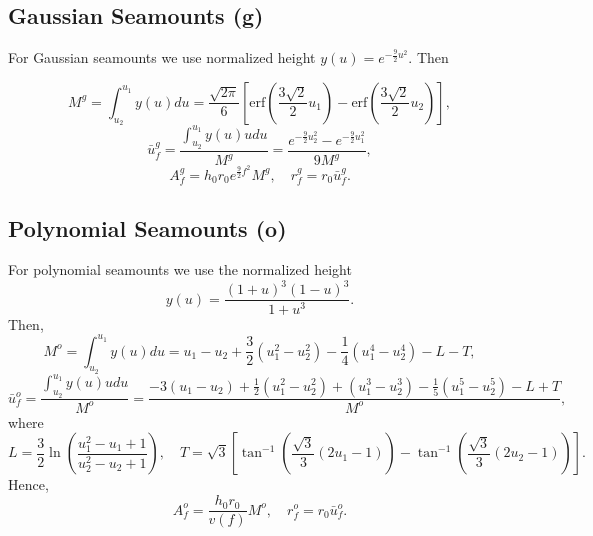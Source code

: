 \subsection{Gaussian Seamounts (g)}

For Gaussian seamounts we use normalized height $y(u) = e^{-\frac{9}{2}u^2}$. Then

\begin{equation*}
M^g = \int_{u_2}^{u_1} y(u) du = \frac{\sqrt{2\pi}}{6} \left [ \mbox{erf} \left (\frac{3\sqrt{2}}{2}u_1\right ) - \mbox{erf} \left (\frac{3\sqrt{2}}{2}u_2\right ) \right ],
\end{equation*}
\begin{equation*}
\bar{u}_f^g = \frac{\int_{u_2}^{u_1} y(u) u du}{M^g} = \frac{e^{-\frac{9}{2}u_2^2} - e^{-\frac{9}{2}u_1^2}}{9M^g},
\end{equation*}
\begin{equation}
A_f^g = h_0 r_0 e^{\frac{9}{2}f^2} M^g, \quad r_f^g = r_0\bar{u}_f^g.
\end{equation}

\subsection{Polynomial Seamounts (o)}

For polynomial seamounts we use the normalized height
\begin{equation*}
y(u) = \frac{(1 + u)^3 (1 - u)^3}{1 + u^3}.
\end{equation*}
Then,
\begin{equation*}
M^o = \int_{u_2}^{u_1} y(u) du = u_1 - u_2 + \frac{3}{2}\left (u_1^2 - u_2^2 \right ) - \frac{1}{4} \left (u_1^4 - u_2^4\right ) - L - T,
\end{equation*}
\begin{equation*}
\bar{u}_f^o = \frac{\int_{u_2}^{u_1} y(u) u du}{M^o} = \frac{- 3 (u_1 - u_2) + \frac{1}{2}(u_1^2 - u_2^2) + (u_1^3 - u_2^3) - \frac{1}{5}(u_1^5 - u_2^5) - L + T}{M^o},
\end{equation*}
where 
\begin{equation*}
L = \frac{3}{2} \ln \left ( \frac{u_1^2 - u_1 + 1}{u_2^2 - u_2 + 1}\right ), \quad T = \sqrt{3} \left [ \tan^{-1} \left (\frac{\sqrt{3}}{3}(2u_1 - 1)\right ) - \tan^{-1} \left (\frac{\sqrt{3}}{3}(2u_2 - 1)\right )\right ].
\end{equation*}
Hence,
\begin{equation}
A_f^o = \frac{h_0 r_0}{v(f)} M^o, \quad r_f^o = r_0\bar{u}_f^o.
\end{equation}

